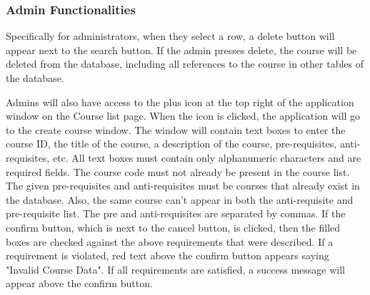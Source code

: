 \documentclass[12pt, a4paper]{article}
\begin{document}
\subsubsection*{Admin Functionalities}
Specifically for administrators, when they select a row, a delete button will appear next to the search button. If the admin presses delete, the course will be deleted from the database, including all references to the course in other tables of the database.

Admins will also have access to the plus icon at the top right of the application window on the Course list page. When the icon is clicked, the application will go to the create course window. The window will contain text boxes to enter the course ID, the title of the course, a description of the course, pre-requisites, anti-requisites, etc. All text boxes must contain only alphanumeric characters and are required fields. The course code must not already be present in the course list. The given pre-requisites and anti-requisites must be courses that already exist in the database. Also, the same course can't appear in both the anti-requisite and pre-requisite list. The pre and anti-requisites are separated by commas. If the confirm button, which is next to the cancel button, is clicked, then the filled boxes are checked against the above requirements that were described. If a requirement is violated, red text above the confirm button appears saying "Invalid Course Data". If all requirements are satisfied, a success message will appear above the confirm button.
\end{document}
